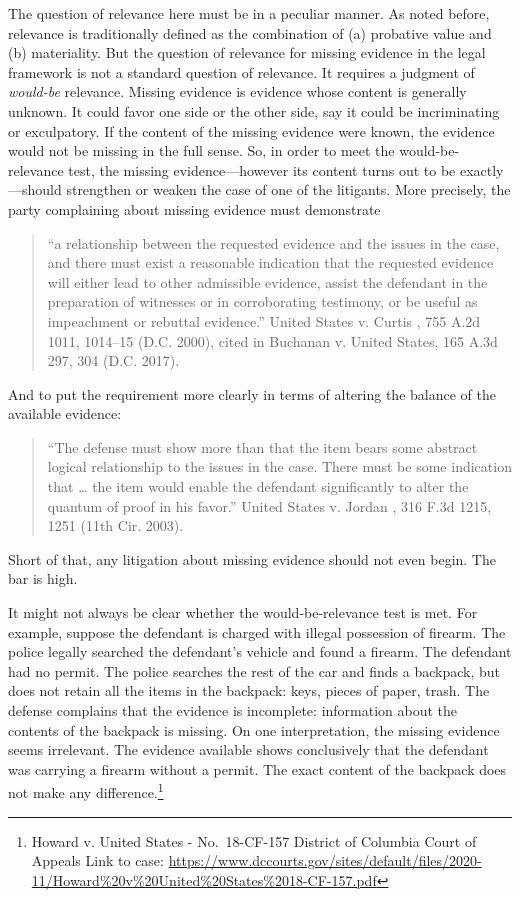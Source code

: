 \documentclass[
  10pt,
  dvipsnames,enabledeprecatedfontcommands]{scrartcl}
\begin{document}
The question of relevance here must be in a peculiar manner. As noted
before, relevance is traditionally defined as the combination of (a)
probative value and (b) materiality. But the question of relevance for
missing evidence in the legal framework is not a standard question of
relevance. It requires a judgment of \textit{would-be} relevance.
Missing evidence is evidence whose content is generally unknown. It
could favor one side or the other side, say it could be incriminating or
exculpatory. If the content of the missing evidence were known, the
evidence would not be missing in the full sense. So, in order to meet
the would-be-relevance test, the missing evidence---however its content
turns out to be exactly---should strengthen or weaken the case of one of
the litigants. More precisely, the party complaining about missing
evidence must demonstrate

\begin{quote}
``a relationship between the requested evidence and the issues in the
case, and there must exist a reasonable indication that the requested
evidence will either lead to other admissible evidence, assist the
defendant in the preparation of witnesses or in corroborating testimony,
or be useful as impeachment or rebuttal evidence.'' United States v.
Curtis , 755 A.2d 1011, 1014--15 (D.C. 2000), cited in Buchanan v.
United States, 165 A.3d 297, 304 (D.C. 2017).
\end{quote}

\noindent And to put the requirement more clearly in terms of altering
the balance of the available evidence:

\begin{quote}
``The defense must show more than that the item bears some abstract
logical relationship to the issues in the case. There must be some
indication that \ldots{} the item would enable the defendant
significantly to alter the quantum of proof in his favor.'' United
States v. Jordan , 316 F.3d 1215, 1251 (11th Cir. 2003).
\end{quote}

\noindent Short of that, any litigation about missing evidence should
not even begin. The bar is high.

It might not always be clear whether the would-be-relevance test is met.
For example, suppose the defendant is charged with illegal possession of
firearm. The police legally searched the defendant's vehicle and found a
firearm. The defendant had no permit. The police searches the rest of
the car and finds a backpack, but does not retain all the items in the
backpack: keys, pieces of paper, trash. The defense complains that the
evidence is incomplete: information about the contents of the backpack
is missing. On one interpretation, the missing evidence seems
irrelevant. The evidence available shows conclusively that the defendant
was carrying a firearm without a permit. The exact content of the
backpack does not make any difference.\footnote{Howard v. United States
  - No.~18-CF-157 District of Columbia Court of Appeals Link to case:
  \url{https://www.dccourts.gov/sites/default/files/2020-11/Howard\%20v\%20United\%20States\%2018-CF-157.pdf}}
\end{document}
